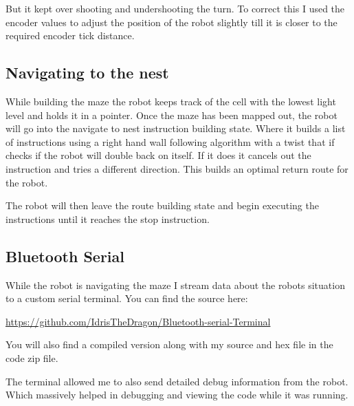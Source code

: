 \documentclass[11pt,a4paper,titlepage]{article}
\begin{document}
                But it kept over shooting and undershooting the turn. 
                To correct this I used the encoder values to adjust the position of the robot slightly till it is closer to the required encoder tick distance. 
        \subsection{Navigating to the nest}
            While building the maze the robot keeps track of the cell with the lowest light level and holds it in a pointer. 
            Once the maze has been mapped out, the robot will go into the navigate to nest instruction building state. 
            Where it builds a list of instructions using a right hand wall following algorithm with a twist that if checks if the robot will double back on itself.
            If it does it cancels out the instruction and tries a different direction.
            This builds an optimal return route for the robot.
            
            The robot will then leave the route building state and begin executing the instructions until it reaches the stop instruction.
        \subsection{Bluetooth Serial}
            While the robot is navigating the maze I stream data about the robots situation to a custom serial terminal. 
            You can find the source here:

                \url{https://github.com/IdrisTheDragon/Bluetooth-serial-Terminal}

            You will also find a compiled version along with my source and hex file in the code zip file.

            The terminal allowed me to also send detailed debug information from the robot. 
            Which massively helped in debugging and viewing the code while it was running.
\end{document}
